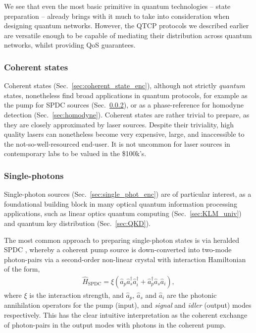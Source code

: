 We see that even the most basic primitive in quantum technologies -- state preparation -- already brings with it much to take into consideration when designing quantum networks. However, the QTCP protocols we described earlier are versatile enough to be capable of mediating their distribution across quantum networks, whilst providing QoS guarantees.

%
%

\subsubsection{Coherent states} \label{sec:coherent_states} 

Coherent states (Sec.~\ref{sec:coherent_state_enc}), although not strictly \textit{quantum} states, nonetheless find broad applications in quantum protocols, for example as the pump for SPDC sources (Sec.~\ref{sec:single_phot_src}), or as a phase-reference for homodyne detection (Sec.~\ref{sec:homodyne}). Coherent states are rather trivial to prepare, as they are closely approximated by laser sources. Despite their triviality, high quality lasers can nonetheless become very expensive, large, and inaccessible to the not-so-well-resourced end-user. It is not uncommon for laser sources in contemporary labs to be valued in the \$100k's.

%
%

\subsubsection{Single-photons} \label{sec:single_phot_src} 

Single-photon sources (Sec.~\ref{sec:single_phot_enc}) \cite{bib:Oxborrow05} are of particular interest, as a foundational building block in many optical quantum information processing applications, such as linear optics quantum computing (Sec.~\ref{sec:KLM_univ}) and quantum key distribution (Sec.~\ref{sec:QKD}).

The most common approach to preparing single-photon states is via heralded SPDC \cite{bib:URen03, bib:URen05}, whereby a coherent pump source is down-converted into two-mode photon-pairs via a second-order non-linear crystal with interaction Hamiltonian of the form,
\begin{align}
\hat{H}_\text{SPDC} = \xi(\hat{a}_p\hat{a}_s^\dag\hat{a}_i^\dag + \hat{a}_p^\dag\hat{a}_s\hat{a}_i),
\end{align}
where $\xi$ is the interaction strength, and $\hat{a}_p$, $\hat{a}_s$ and $\hat{a}_i$ are the photonic annihilation operators for the pump (input), and \textit{signal} and \textit{idler} (output) modes respectively. This has the clear intuitive interpretation as the coherent exchange of photon-pairs in the output modes with photons in the coherent pump.

